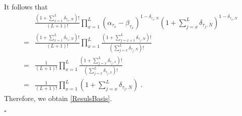 \documentclass[10pt]{article}
\numberwithin{equation}{section}
\numberwithin{equation}{subsection}
\newcommand{\dt}{\;.}
\begin{document}
\begin{comment}
{\color{blue}
\begin{equation}
\begin{split}
\Psi^{''}(\tau_1,\ldots,\tau_L)&=\left[\prod_{x=1}^{L}(\alpha_{\tau_{x}}-\beta_{\tau_{x}})^{(1-\delta_{\tau_{x},N})}\right] \frac{\Gamma\left(2+L-\sum_{x=1}^{L}(1-\delta_{\tau_{x},N})\right)}{\Gamma\left(2+L\right)}\prod_{x=1}^{L} \frac{\Gamma\left(2+L-x-\sum_{j=x+1}^{L}(1-\delta_{\tau_{j},N})\right)}{\Gamma\left(2+L-x-\sum_{j=x}^{L}(1-\delta_{\tau_{j},N})\right)}\\
&=\left[\prod_{x=1}^{L}(\alpha_{\tau_{x}}-\beta_{\tau_{x}})^{(1-\delta_{\tau_{x},N})}\right] \frac{\Gamma\left(2 \right)}{\Gamma\left(2+L\right)}\prod_{x=1}^{L} \frac{\Gamma\left(3+L-x-\sum_{j=x}^{L}(1-\delta_{\tau_{j},N})\right)}{\Gamma\left(2+L-x-\sum_{j=x}^{L}(1-\delta_{\tau_{j},N})\right)}\\
&=\left[\prod_{x=1}^{L}(\alpha_{\tau_{x}}-\beta_{\tau_{x}})^{(1-\delta_{\tau_{x},N})}\right] \frac{\Gamma\left(2 \right)}{\Gamma\left(2+L\right)}\prod_{x=1}^{L} \frac{\Gamma\left(2+\sum_{j=x}^{L}\delta_{\tau_{j},N}\right)}{\Gamma\left(1+\sum_{j=x}^{L}\delta_{\tau_{j},N}\right)}\\
&=  \frac{1}{\left(1+L\right)!}\prod_{x=1}^{L} (\alpha_{\tau_{x}}-\beta_{\tau_{x}})^{(1-\delta_{\tau_{x},N})}\left(1+\sum_{j=x}^{L}\delta_{\tau_{j},N}\right)
\end{split}
\end{equation}}
\end{comment}
It follows that 
\begin{align}\label{remove-exponent}
&\frac{(1+\sum_{x=1}^{L}\delta_{\tau_{x},N})!}{(L+1)!}\prod_{x=1}^{L}\left(\alpha_{\tau_{x}}-\beta_{\tau_{x}}\right)^{1-\delta_{\tau_{x},N}}\left(1+\sum_{j=x}^{L}\delta_{\tau_{j},N}\right)^{1-\delta_{\tau_{x},N}}\nonumber\\
=&\frac{(1+\sum_{x=1}^{L}\delta_{\tau_{x},N})!}{(L+1)!}\prod_{x=1}^{L}\frac{(1+\sum_{j=x+1}^{L}\delta_{\tau_{j},N})!}{(\sum_{j=x}^{L}\delta_{\tau_{j},N})!}\nonumber\\
=&\frac{1}{(L+1)!}\prod_{x=1}^{L}\frac{(1+\sum_{j=x}^{L}\delta_{\tau_{j},x})!}{(\sum_{j=x}^{L}\delta_{\tau_{j},x})!}\nonumber\\
=&\frac{1}{(L+1)!}\prod_{x=1}^{L}\left(1+\sum_{j=x}^{L}\delta_{\tau_{j},N}\right)\dt
\end{align}
Therefore, we obtain \eqref{ResulsBasis}.
\begin{flushright}
	$\square$
\end{flushright} 
\end{document}
